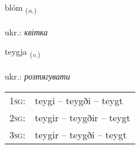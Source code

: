 \documentclass[frontgrid, backgrid]{flacards}\usepackage[]{graphicx}\usepackage[]{xcolor}
\begin{document}
\renewcommand{\flhead}{\vskip5pt \fboxsep=0pt {\small\bfseries\footnotesize Nafnorð | іменник}}
\renewcommand{\fcfoot}{\vskip5pt \fboxsep=0pt \hspace{2pt}{\small\bfseries\footnotesize 2K}}

\renewcommand{\blhead}{\vskip5pt {\small\bfseries\footnotesize Nafnorð | іменник }}
\renewcommand{\bcfoot}{\vskip5pt \hspace{2pt}{\small\bfseries\footnotesize 2K}}


{blóm \small{\textsubscript{(\textit{n.})}} \\[1ex] %
\textphonetic{[plouːm]} \\
ukr.: \emph{квітка} \\  [2ex]
\renewcommand*{\arraystretch}{0.8}
}

\renewcommand{\flhead}{\vskip5pt \fboxsep=0pt {\small\bfseries\footnotesize Sagnorð | дієслово}}
\renewcommand{\fcfoot}{\vskip5pt \fboxsep=0pt \hspace{2pt}{\small\bfseries\footnotesize 2K}}

\renewcommand{\blhead}{\vskip5pt {\small\bfseries\footnotesize Sagnorð | дієслово }}
\renewcommand{\bcfoot}{\vskip5pt \hspace{2pt}{\small\bfseries\footnotesize 2K}}


{teygja \small{\textsubscript{(\textit{v.})}} \\[1ex] %
\textphonetic{[tʰeija]} \\
ukr.: \emph{розтягувати} \\  [2ex]
\renewcommand*{\arraystretch}{0.8}
\begin{tabular}{p{1cm}l}
\textsc{1sg}: & teygi -- teygði -- teygt \\ 
\textsc{2sg}: & teygir -- teygðir -- teygt \\ 
\textsc{3sg}: & teygir -- teygði -- teygt \\ 
\end{tabular}
}
\end{document}

